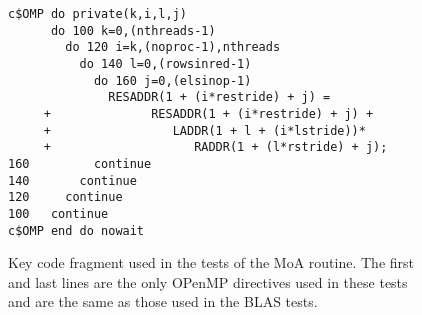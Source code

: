 \documentclass[aps,prl,twocolumn,groupedaddress,floatfix]{revtex4}
\begin{document}
\begin{figure}
\begin{verbatim}
c$OMP do private(k,i,l,j)
      do 100 k=0,(nthreads-1)
        do 120 i=k,(noproc-1),nthreads
          do 140 l=0,(rowsinred-1)
            do 160 j=0,(elsinop-1)
              RESADDR(1 + (i*restride) + j) =
     +              RESADDR(1 + (i*restride) + j) +
     +                 LADDR(1 + l + (i*lstride))*
     +                    RADDR(1 + (l*rstride) + j);
160         continue
140       continue
120     continue
100   continue
c$OMP end do nowait

\end{verbatim}
\caption{
\label{moa_code}
Key code fragment used in the tests of the MoA routine.  The
first and last lines are the only OPenMP directives used in these tests and
are the same as those used in the BLAS tests.
}
\end{figure}





\end{document}
